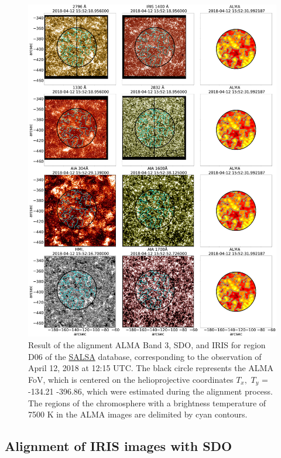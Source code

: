\documentclass[a4paper,alpha-refs]{eSpectra}
\begin{document}
\begin{figure}[htb!]
   \centering
    \includegraphics[width=\textwidth]{images/result_alingnment_with_iris_new_plot_dpi_100.jpg}
    \caption{
    Result of the alignment  ALMA Band 3, SDO,  and IRIS for region D06 of the \href{http://sdc.uio.no/salsa/}{SALSA} database, corresponding to the observation of April 12, 2018 at 12:15 UTC. The black circle represents the ALMA FoV, which is centered on the helioprojective coordinates $T_x,$ $ T_y$ = -134.21 -396.86, which were estimated during the alignment process. The regions of the chromosphere with a brightness temperature of  7500 K in the ALMA images are delimited by cyan contours.}
    \label{chap_2:fig_result_IRIS_and_SDO_aling}
\end{figure}


\subsection{Alignment of IRIS images with SDO}
\label{Alignment_of_IRIS_images_with_SDO}
\end{document}
